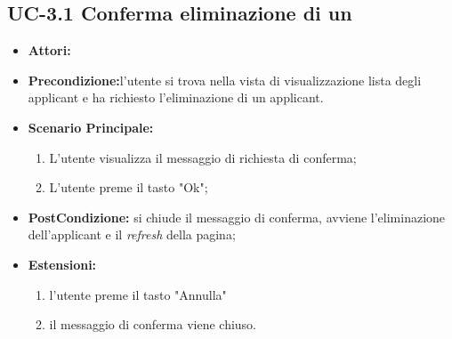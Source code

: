 \subsection{UC-3.1 Conferma eliminazione di un\applicant}
\begin{itemize}
	\item \textbf{Attori:}\loggedusr
	\item \textbf{Precondizione:}l'utente si trova nella vista di visualizzazione lista degli applicant e ha richiesto l'eliminazione di un applicant.
	\item \textbf{Scenario Principale:}
	\begin{enumerate}
		\item L'utente visualizza il messaggio di richiesta di conferma;
		\item L'utente preme il tasto "Ok";
	\end{enumerate}
	\item \textbf{PostCondizione:} si chiude il messaggio di conferma, avviene l'eliminazione dell'applicant e il \textit{refresh} della pagina;
	\item \textbf{Estensioni:} 
	\begin{enumerate}
		\item l'utente preme il tasto "Annulla"
		\item il messaggio di conferma viene chiuso.
	\end{enumerate}
\end{itemize}


